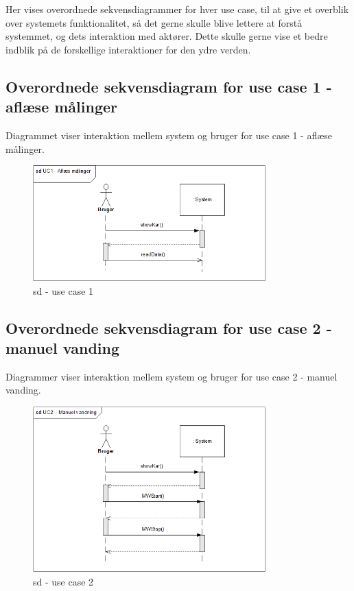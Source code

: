 
Her vises overordnede sekvensdiagrammer for hver use case, til at give et overblik over systemets funktionalitet, så det gerne skulle blive lettere at forstå systemmet, og dets interaktion med aktører. Dette skulle gerne vise et bedre indblik på de forskellige interaktioner for den ydre verden. 

\subsection{Overordnede sekvensdiagram for use case 1 - aflæse målinger}
Diagrammet viser interaktion mellem system og bruger for use case 1 - aflæse målinger.

\begin{figure}[H]
    \centering
    \includegraphics[width=0.8\textwidth]{Systemarkitektur/OverordnedeSekvensdiagrammer/sd_UC1.PNG}
    \caption{sd - use case 1}
    \label{fig:sd_UC1}
\end{figure}

\subsection{Overordnede sekvensdiagram for use case 2 - manuel vanding}
Diagrammer viser interaktion mellem system og bruger for use case 2 - manuel vanding.

\begin{figure}[H]
    \centering
    \includegraphics[width=0.8\textwidth]{Systemarkitektur/OverordnedeSekvensdiagrammer/sd_UC2.PNG}
    \caption{sd - use case 2}
    \label{fig:sd_UC2}
\end{figure}


